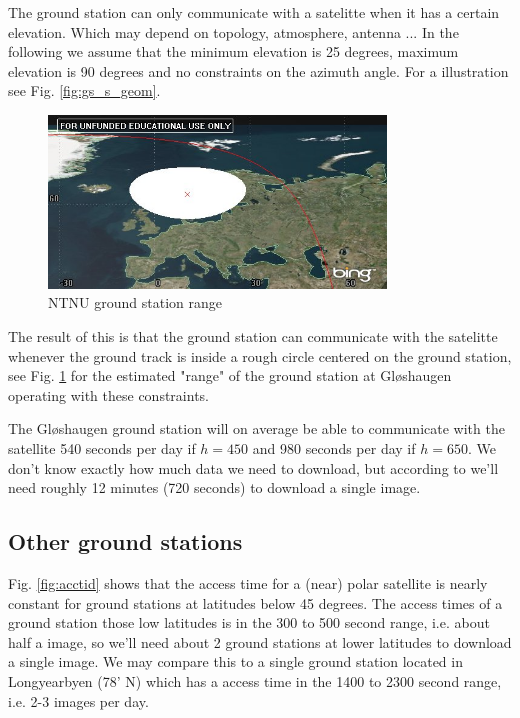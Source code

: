 The ground station can only communicate with a satelitte when it has a certain elevation. Which may depend on topology, atmosphere, antenna ...
In the following we assume that the minimum elevation is 25 degrees, maximum elevation is 90 degrees and no constraints on the azimuth angle.  For a illustration see Fig. \ref{fig:gs_s_geom}.

\begin{figure}
  \begin{center}
    \includegraphics[width=0.8\textwidth]{Figures/ntnu_footprint}
  \end{center}
  \caption[ntnu footprint]{NTNU ground station range}
  \label{fig:ntnu_range}
\end{figure}

The result of this is that the ground station can communicate with the satelitte whenever the ground track is inside a rough circle centered on the ground station, see Fig. \ref{fig:ntnu_range} for the estimated "range" of the ground station at Gløshaugen operating with these constraints.

The Gløshaugen ground station will on average be able to communicate with the satellite 540 seconds per day if $h=450$ and 980 seconds per day if $h=650$. We don't know exactly how much data we need to download, but according to \cite{eks-kom} we'll need roughly 12 minutes (720 seconds) to download a single image. 

\subsection{Other ground stations}
Fig. \ref{fig:acctid} shows that the access time for a (near) polar satellite is nearly constant for ground stations at latitudes below 45 degrees. The access times of a ground station those low latitudes is in the 300 to 500 second range, i.e. about half a image, so we'll need about 2 ground stations at lower latitudes to download a single image. We may compare this to a single ground station located in Longyearbyen (78' N) which has a access time in the 1400 to 2300 second range, i.e. 2-3 images per day. 

